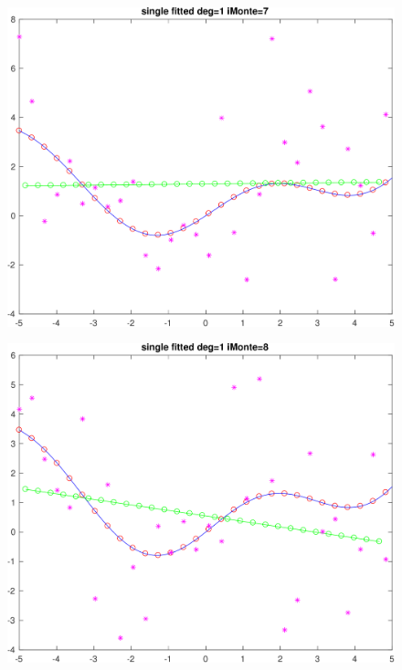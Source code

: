 \documentclass[11pt]{article}
\begin{document}
\begin{figure}[h!]
\centering\includegraphics[scale=0.1]{single_poly_d_1_iMonte_7.png}
\end{figure}


\begin{figure}[h!]
\centering\includegraphics[scale=0.1]{single_poly_d_1_iMonte_8.png}
\end{figure}
\end{document}
